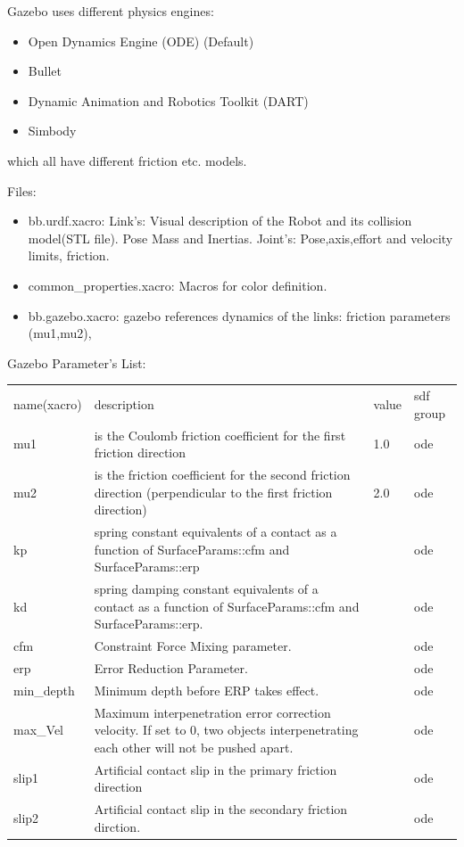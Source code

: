 \documentclass[twoside,colorback,accentcolor=tud4c,11pt]{tudreport}
\begin{document}
Gazebo uses different physics engines:\\
\begin{itemize}
	\item Open Dynamics Engine (ODE) (Default)
	\item Bullet
	\item Dynamic Animation and Robotics Toolkit (DART)
	\item Simbody
\end{itemize}
 which all have different friction etc. models.

Files:
\begin{itemize}
	\item bb.urdf.xacro: Link's: Visual description of the Robot and its collision model(STL file). Pose Mass and Inertias. Joint's: Pose,axis,effort and velocity limits, friction.
	\item common\_properties.xacro: Macros for color definition.
	\item bb.gazebo.xacro: gazebo references dynamics of the links: friction parameters (mu1,mu2), 
\end{itemize}

Gazebo Parameter's List:\\
\begin{tabular}{l L{12cm} l l}
	name(xacro)&description&value&sdf group\\
	mu1&is the Coulomb friction coefficient for the first friction direction&1.0&ode\\
	mu2& is the friction coefficient for the second friction direction (perpendicular to the first friction direction)&2.0&ode\\
	kp&spring constant equivalents of a contact as a function of SurfaceParams::cfm and SurfaceParams::erp & &ode \\
	kd&spring damping constant equivalents of a contact as a function of SurfaceParams::cfm and SurfaceParams::erp.   & &ode \\
	cfm&Constraint Force Mixing parameter.& &ode \\
	erp&Error Reduction Parameter.& &ode \\
	min\_depth&Minimum depth before ERP takes effect.   & &ode \\
	max\_Vel& Maximum interpenetration error correction velocity.
	If set to 0, two objects interpenetrating each other will not be pushed apart.  & &ode \\
	slip1&Artificial contact slip in the primary friction direction  & &ode \\
	slip2&Artificial contact slip in the secondary friction dirction.& &ode \\
\end{tabular}
\end{document}
